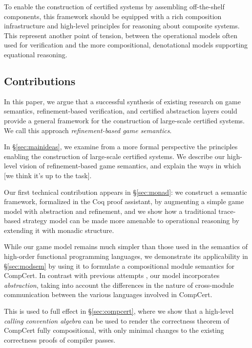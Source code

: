 \documentclass[acmsmall,timestamp,review,anonymous]{acmart}
\begin{document}
To enable the construction of certified systems
by assembling off-the-shelf components,
this framework should be equipped with
a rich composition infrastructure
and high-level principles for
reasoning about composite systems.
This represent another point of tension,
between the operational models
often used for verification
and the more compositional, denotational models
supporting equational reasoning.


\subsection{Contributions} %

In this paper,
we argue that
a successful synthesis of existing research
on game semantics,
refinement-based verification,
and certified abstraction layers
could provide a general framework
for the construction of large-scale certified systems.
We call this approach \emph{refinement-based game semantics}.

In \S\ref{sec:mainideas},
we examine from a more formal perspective
the principles enabling the construction
of large-scale certified systems.
We describe our high-level vision of
refinement-based game semantics,
and explain the ways in which
[we think it's up to the task].

Our first technical contribution
appears in \S\ref{sec:monad}:
we construct a semantic framework, formalized in the Coq proof assistant,
by augmenting a simple game model
with abstraction and refinement,
and we show how a traditional
trace-based strategy model
can be made more amenable to operational reasoning
by extending it with monadic structure.

While our game model remains much simpler than
those used in the semantics of high-order
functional programming languages,
we demonstrate its applicability in \S\ref{sec:modsem}
by using it to formulate a compositional module semantics
for CompCert.
In contrast with previous attempts \cite{compcompcert,cpp15},
our model incorporates \emph{abstraction},
taking into account the differences in
the nature of cross-module communication
between the various languages involved in CompCert.

This is used to full effect in \S\ref{sec:compcert},
where we show that a high-level
\emph{calling convention algebra}
can be used to render the correctness theorem of CompCert
fully compositional,
with only minimal changes to the existing correctness proofs
of compiler passes.
\end{document}
